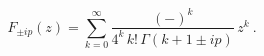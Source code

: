 \begin{equation*}
F_{\pm ip}(z)=\sum_{k=0}^{\infty }\frac{(-)^{k}}{4^{k}\,k!\,\Gamma (k+1\pm
ip)}\,z^{k}\ .
\end{equation*}

